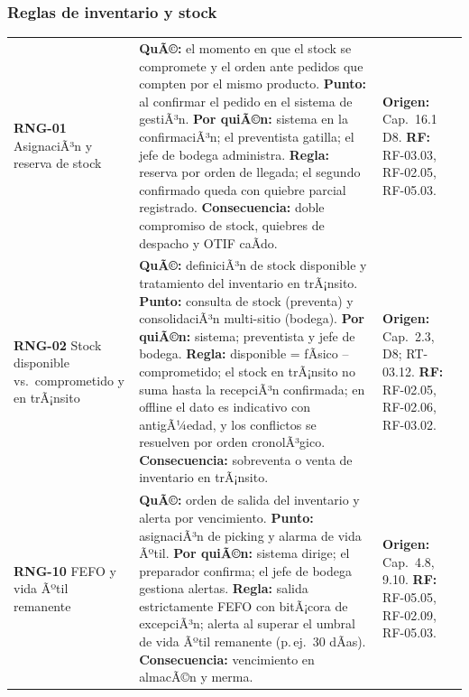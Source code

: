 \subsubsection{Reglas de inventario y stock}

\begin{table}[htbp]
\centering
\small
\begin{tabularx}{\textwidth}{@{}L{2.4cm}L{8.3cm}L{4.2cm}@{}}
\toprule
\textbf{RNG-01} \textbar{} AsignaciÃ³n y reserva de stock &
\textbf{QuÃ©:} el momento en que el stock se compromete y el orden ante pedidos que
compten por el mismo producto. \textbf{Punto:} al confirmar el pedido en el sistema de
gestiÃ³n. \textbf{Por quiÃ©n:} sistema en la confirmaciÃ³n; el preventista gatilla; el jefe
de bodega administra. \textbf{Regla:} reserva por orden de llegada; el segundo
confirmado queda con quiebre parcial registrado. \textbf{Consecuencia:} doble compromiso
de stock, quiebres de despacho y OTIF caÃ­do. &
\textbf{Origen:} Cap.\ 16.1 D8. \textbf{RF:} RF-03.03, RF-02.05, RF-05.03. \\
\addlinespace
\textbf{RNG-02} \textbar{} Stock disponible vs.\ comprometido y en trÃ¡nsito &
\textbf{QuÃ©:} definiciÃ³n de stock disponible y tratamiento del inventario en trÃ¡nsito.
\textbf{Punto:} consulta de stock (preventa) y consolidaciÃ³n multi-sitio (bodega).
\textbf{Por quiÃ©n:} sistema; preventista y jefe de bodega. \textbf{Regla:} disponible =
fÃ­sico -- comprometido; el stock en trÃ¡nsito no suma hasta la recepciÃ³n confirmada; en
offline el dato es indicativo con antigÃ¼edad, y los conflictos se resuelven por orden
cronolÃ³gico. \textbf{Consecuencia:} sobreventa o venta de inventario en trÃ¡nsito. &
\textbf{Origen:} Cap.\ 2.3, D8; RT-03.12. \textbf{RF:} RF-02.05, RF-02.06, RF-03.02. \\
\addlinespace
\textbf{RNG-10} \textbar{} FEFO y vida Ãºtil remanente &
\textbf{QuÃ©:} orden de salida del inventario y alerta por vencimiento. \textbf{Punto:}
asignaciÃ³n de picking y alarma de vida Ãºtil. \textbf{Por quiÃ©n:} sistema dirige; el
preparador confirma; el jefe de bodega gestiona alertas. \textbf{Regla:} salida
estrictamente FEFO con bitÃ¡cora de excepciÃ³n; alerta al superar el umbral de vida Ãºtil
remanente (p.\,ej.\ 30 dÃ­as). \textbf{Consecuencia:} vencimiento en almacÃ©n y merma. &
\textbf{Origen:} Cap.\ 4.8, 9.10. \textbf{RF:} RF-05.05, RF-02.09, RF-05.03. \\
\bottomrule
\end{tabularx}
\end{table}

